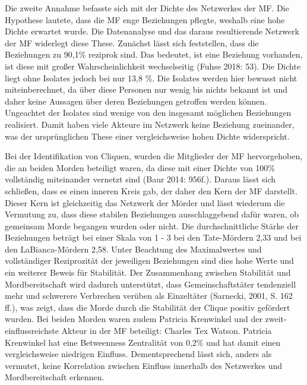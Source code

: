 \documentclass[
]{article}
\begin{document}
Die zweite Annahme befasste sich mit der Dichte des Netzwerkes der MF.
Die Hypothese lautete, dass die MF enge Beziehungen pflegte, weshalb
eine hohe Dichte erwartet wurde. Die Datenanalyse und das daraus
resultierende Netzwerk der MF widerlegt diese These. Zunächst lässt sich
feststellen, dass die Beziehungen zu 90,1\% reziprok sind. Das bedeutet,
ist eine Beziehung vorhanden, ist diese mit großer Wahrscheinlichkeit
wechselseitig (Fuhse 2018: 53). Die Dichte liegt ohne Isolates jedoch
bei nur 13,8 \%. Die Isolates werden hier bewusst nicht miteinberechnet,
da über diese Personen nur wenig bis nichts bekannt ist und daher keine
Aussagen über deren Beziehungen getroffen werden können. Ungeachtet der
Isolates sind wenige von den insgesamt möglichen Beziehungen realisiert.
Damit haben viele Akteure im Netzwerk keine Beziehung zueinander, was
der ursprünglichen These einer vergleichsweise hohen Dichte
widerspricht.

Bei der Identifikation von Cliquen, wurden die Mitglieder der MF
hervorgehoben, die an beiden Morden beteiligt waren, da diese mit einer
Dichte von 100\% vollständig miteinander vernetzt sind (Baur 2014:
956f.). Daraus lässt sich schließen, dass es einen inneren Kreis gab,
der daher den Kern der MF darstellt. Dieser Kern ist gleichzeitig das
Netzwerk der Mörder und lässt wiederum die Vermutung zu, dass diese
stabilen Beziehungen ausschlaggebend dafür waren, ob gemeinsam Morde
begangen wurden oder nicht. Die durchschnittliche Stärke der Beziehungen
beträgt bei einer Skala von 1 - 3 bei den Tate-Mördern 2,33 und bei den
LaBianca-Mördern 2,58. Unter Beachtung des Maximalwertes und
vollständiger Reziprozität der jeweiligen Beziehungen sind dies hohe
Werte und ein weiterer Beweis für Stabilität. Der Zusammenhang zwischen
Stabilität und Mordbereitschaft wird dadurch unterstützt, dass
Gemeinschaftstäter tendenziell mehr und schwerere Verbrechen verüben als
Einzeltäter (Sarnecki, 2001, S. 162 ff.), was zeigt, dass die Morde
durch die Stabilität der Clique positiv gefördert wurden. Bei beiden
Morden waren zudem Patricia Krenwinkel und der zweit-einflussreichste
Akteur in der MF beteiligt: Charles Tex Watson. Patricia Krenwinkel hat
eine Betweenness Zentralität von 0,2\% und hat damit einen
vergleichsweise niedrigen Einfluss. Dementsprechend lässt sich, anders
als vermutet, keine Korrelation zwischen Einfluss innerhalb des
Netzwerkes und Mordbereitschaft erkennen.
\end{document}
